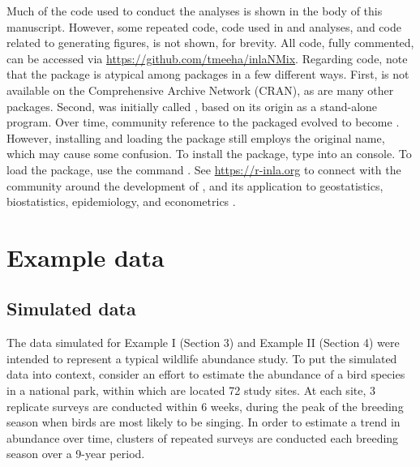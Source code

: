 \documentclass[codesnippet]{jss}
\begin{document}
Much of the code used to conduct the  analyses is shown in the 
body of this manuscript. However, some repeated  code, code used 
in  and  analyses, and code related to 
generating figures, is not shown, for brevity. All code, fully commented, 
can be accessed via \url{https://github.com/tmeeha/inlaNMix}. Regarding 
code, note that the  package is atypical among  
packages in a few different ways.  First,  is not available on 
the Comprehensive  Archive Network (CRAN), as are many other 
 packages. Second,  was initially called , 
based on its origin as a stand-alone  program.  Over time, 
community reference to the packaged evolved to become .  
However, installing and loading the package still employs the original name, 
which may cause some confusion. To install the package, type 
 into an 
 console. To load the package, use the  command 
. See \url{https://r-inla.org} to connect with the 
community around the development of , and its application to 
geostatistics, biostatistics, epidemiology, and econometrics 
\citep{Lindgren_Rue_2015,Blangiardo_Cameletti_2015}.

\section[Example data]{Example data}
\subsection[Simulated data]{Simulated data}
The data simulated for Example I (Section 3) and Example II (Section 4) were 
intended to represent a typical wildlife abundance study. To put the 
simulated data into context, consider an effort to estimate the abundance of 
a bird species in a national park, within which are located 72 study sites. 
At each site, 3 replicate surveys are conducted within 6 weeks, during the 
peak of the breeding season when birds are most likely to be singing. In 
order to estimate a trend in abundance over time, clusters of repeated 
surveys are conducted each breeding season over a 9-year period.
\end{document}
